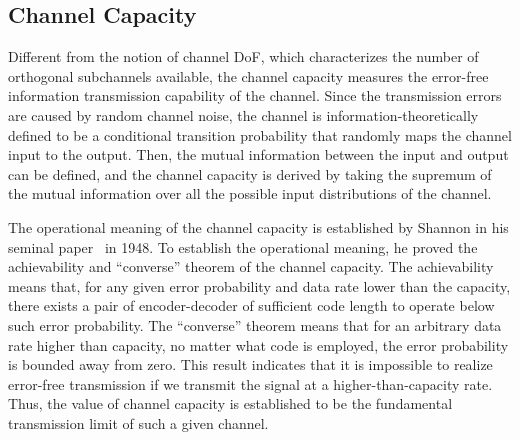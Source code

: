 \documentclass[journal,twocolumn]{IEEEtran}
\begin{document}
\subsection{Channel Capacity}
\label{Sec_2_Subsec_2}
Different from the notion of channel DoF, which characterizes the number of orthogonal subchannels available, the channel capacity measures the error-free information transmission capability of the channel. 
Since the transmission errors are caused by random channel noise, the channel is information-theoretically defined to be a conditional transition probability that randomly maps the channel input to the output. 
Then, the mutual information between the input and output can be defined, and the channel capacity is derived by taking the supremum of the mutual information over all the possible input distributions of the channel. 

The operational meaning of the channel capacity is established by Shannon in his seminal paper~\cite{shannon1948mathematical} in 1948. To establish the operational meaning, he proved the achievability and ``converse'' theorem of the channel capacity. The achievability means that, for any given error probability and data rate lower than the capacity, there exists a pair of encoder-decoder of sufficient code length to operate below such error probability. 
The ``converse'' theorem means that for an arbitrary data rate higher than capacity, no matter what code is employed, the error probability is bounded away from zero. This result indicates that it is impossible to realize error-free transmission if we transmit the signal at a higher-than-capacity rate. Thus, the value of channel capacity is established to be the fundamental transmission limit of such a given channel. 
\end{document}
